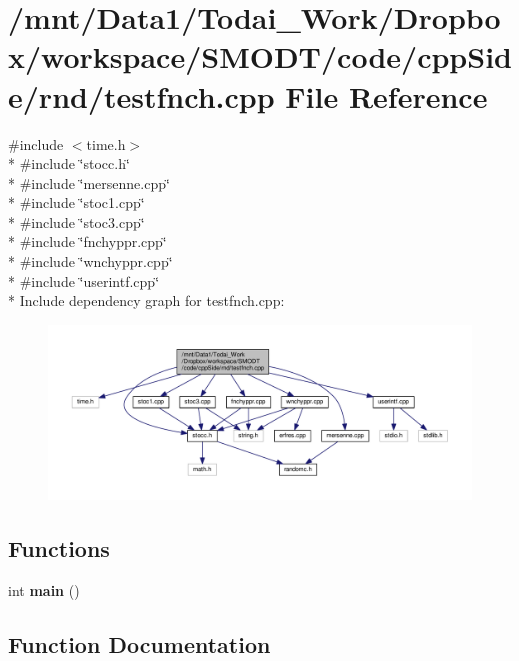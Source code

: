\section{/mnt/\-Data1/\-Todai\-\_\-\-Work/\-Dropbox/workspace/\-S\-M\-O\-D\-T/code/cpp\-Side/rnd/testfnch.cpp File Reference}
\label{rnd_2testfnch_8cpp}
{\ttfamily \#include $<$time.\-h$>$}\\*
{\ttfamily \#include \char`\"{}stocc.\-h\char`\"{}}\\*
{\ttfamily \#include \char`\"{}mersenne.\-cpp\char`\"{}}\\*
{\ttfamily \#include \char`\"{}stoc1.\-cpp\char`\"{}}\\*
{\ttfamily \#include \char`\"{}stoc3.\-cpp\char`\"{}}\\*
{\ttfamily \#include \char`\"{}fnchyppr.\-cpp\char`\"{}}\\*
{\ttfamily \#include \char`\"{}wnchyppr.\-cpp\char`\"{}}\\*
{\ttfamily \#include \char`\"{}userintf.\-cpp\char`\"{}}\\*
Include dependency graph for testfnch.\-cpp\-:\nopagebreak
\begin{figure}[H]
\begin{center}
\leavevmode
\includegraphics[width=350pt]{rnd_2testfnch_8cpp__incl}
\end{center}
\end{figure}
\subsection*{Functions}
\begin{DoxyCompactItemize}
\item 
int {\bf main} ()
\end{DoxyCompactItemize}


\subsection{Function Documentation}
